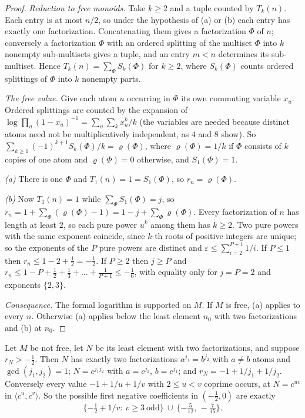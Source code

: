 \begin{proof}
\emph{Reduction to free monoids.} Take $k\ge2$ and a tuple counted by $T_k(n)$. Each entry is at most $n/2$, so under the hypothesis of (a) or (b) each entry has exactly one factorization. Concatenating them gives a factorization $\Phi$ of $n$; conversely a factorization $\Phi$ with an ordered splitting of the multiset $\Phi$ into $k$ nonempty sub-multisets gives a tuple, and an entry $m<n$ determines its sub-multiset. Hence $T_k(n)=\sum_\Phi S_k(\Phi)$ for $k\ge2$, where $S_k(\Phi)$ counts ordered splittings of $\Phi$ into $k$ nonempty parts.

\emph{The free value.} Give each atom $u$ occurring in $\Phi$ its own commuting variable $x_u$. Ordered splittings are counted by the expansion of $\log\prod_u(1-x_u)^{-1}=\sum_u\sum_kx_u^k/k$ (the variables are needed because distinct atoms need not be multiplicatively independent, as $4$ and $8$ show). So $\sum_{k\ge1}(-1)^{k+1}S_k(\Phi)/k=\varrho(\Phi)$, where $\varrho(\Phi)=1/k$ if $\Phi$ consists of $k$ copies of one atom and $\varrho(\Phi)=0$ otherwise, and $S_1(\Phi)=1$.

\emph{(a)} There is one $\Phi$ and $T_1(n)=1=S_1(\Phi)$, so $r_n=\varrho(\Phi)$.

\emph{(b)} Now $T_1(n)=1$ while $\sum_\Phi S_1(\Phi)=j$, so $r_n=1+\sum_\Phi(\varrho(\Phi)-1)=1-j+\sum_\Phi\varrho(\Phi)$.
Every factorization of $n$ has length at least $2$, so each pure power $u^k$ among them has $k\ge2$. Two pure powers with the same exponent coincide, since $k$-th roots of positive integers are unique; so the exponents of the $P$ pure powers are distinct and $\varepsilon\le\sum_{i=2}^{P+1}1/i$. If $P\le1$ then $r_n\le1-2+\tfrac12=-\tfrac12$. If $P\ge2$ then $j\ge P$ and $r_n\le1-P+\tfrac12+\tfrac13+\dots+\tfrac1{P+1}\le-\tfrac16$, with equality only for $j=P=2$ and exponents $\{2,3\}$.

\emph{Consequence.} The formal logarithm is supported on $M$. If $M$ is free, (a) applies to every $n$. Otherwise (a) applies below the least element $n_0$ with two factorizations and (b) at $n_0$.
\end{proof}

\begin{corollary}\label{cor:firstneg}
Let $M$ be not free, let $N$ be its least element with two factorizations, and suppose $r_N>-\tfrac12$. Then $N$ has exactly two factorizations $a^{j_1}=b^{j_2}$ with $a\ne b$ atoms and $\gcd(j_1,j_2)=1$; $N=c^{j_1j_2}$ with $a=c^{j_2}$, $b=c^{j_1}$; and $r_N=-1+1/j_1+1/j_2$.
Conversely every value $-1+1/u+1/v$ with $2\le u<v$ coprime occurs, at $N=c^{uv}$ in $\langle c^u,c^v\rangle$. So the possible first negative coefficients in $(-\tfrac12,0)$ are exactly
\[
\{-\tfrac12+1/v:\ v\ge3\ \text{odd}\}\ \cup\ \{-\tfrac5{12},\,-\tfrac7{15}\}.
\]
\end{corollary}

